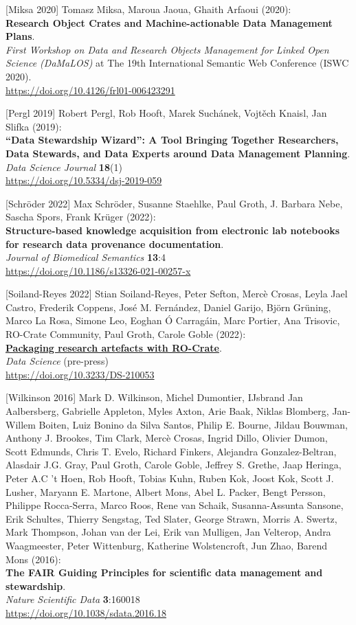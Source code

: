 {[}Miksa 2020{]} Tomasz Miksa, Maroua Jaoua, Ghaith Arfaoui (2020):\\
\textbf{Research Object Crates and Machine-actionable Data Management
Plans}.\\
\emph{First Workshop on Data and Research Objects Management for Linked
Open Science (DaMaLOS)} at The 19th International Semantic Web
Conference (ISWC 2020).\\
\url{https://doi.org/10.4126/frl01-006423291}

{[}Pergl 2019{]} Robert Pergl, Rob Hooft, Marek Suchánek, Vojtěch
Knaisl, Jan Slifka (2019):\\
\textbf{``Data Stewardship Wizard'': A Tool Bringing Together
Researchers, Data Stewards, and Data Experts around Data Management
Planning}.\\
\emph{Data Science Journal} \textbf{18}(1)\\
\url{https://doi.org/10.5334/dsj-2019-059}

{[}Schröder 2022{]} Max Schröder, Susanne Staehlke, Paul Groth, J.
Barbara Nebe, Sascha Spors, Frank Krüger (2022):\\
\textbf{Structure-based knowledge acquisition from electronic lab
notebooks for research data provenance documentation}.\\
\emph{Journal of Biomedical Semantics} \textbf{13}:4\\
\url{https://doi.org/10.1186/s13326-021-00257-x}

{[}Soiland-Reyes 2022{]} Stian Soiland-Reyes, Peter Sefton, Mercè
Crosas, Leyla Jael Castro, Frederik Coppens, José M. Fernández, Daniel
Garijo, Björn Grüning, Marco La Rosa, Simone Leo, Eoghan Ó Carragáin,
Marc Portier, Ana Trisovic, RO-Crate Community, Paul Groth, Carole Goble
(2022):\\
\href{../ro-crate/}{\textbf{Packaging research artefacts with
RO-Crate}}.\\
\emph{Data Science} (pre-press)\\
\url{https://doi.org/10.3233/DS-210053}

{[}Wilkinson 2016{]} Mark D. Wilkinson, Michel Dumontier, IJsbrand Jan
Aalbersberg, Gabrielle Appleton, Myles Axton, Arie Baak, Niklas
Blomberg, Jan-Willem Boiten, Luiz Bonino da Silva Santos, Philip E.
Bourne, Jildau Bouwman, Anthony J. Brookes, Tim Clark, Mercè Crosas,
Ingrid Dillo, Olivier Dumon, Scott Edmunds, Chris T. Evelo, Richard
Finkers, Alejandra Gonzalez-Beltran, Alasdair J.G. Gray, Paul Groth,
Carole Goble, Jeffrey S. Grethe, Jaap Heringa, Peter A.C 't Hoen, Rob
Hooft, Tobias Kuhn, Ruben Kok, Joost Kok, Scott J. Lusher, Maryann E.
Martone, Albert Mons, Abel L. Packer, Bengt Persson, Philippe
Rocca-Serra, Marco Roos, Rene van Schaik, Susanna-Assunta Sansone, Erik
Schultes, Thierry Sengstag, Ted Slater, George Strawn, Morris A. Swertz,
Mark Thompson, Johan van der Lei, Erik van Mulligen, Jan Velterop, Andra
Waagmeester, Peter Wittenburg, Katherine Wolstencroft, Jun Zhao, Barend
Mons (2016):\\
\textbf{The FAIR Guiding Principles for scientific data management and
stewardship}.\\
\emph{Nature Scientific Data} \textbf{3}:160018\\
\url{https://doi.org/10.1038/sdata.2016.18}


